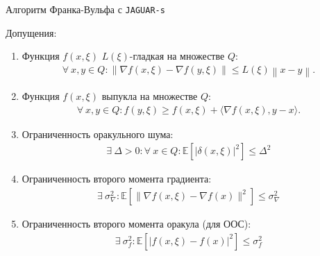 \documentclass{beamer}
\begin{document}
\begin{frame}{Алгоритм Франка-Вульфа с \texttt{JAGUAR-s}}

    Допущения:
    \small{
        \begin{enumerate}
            \item Функция $f(x, \xi)$ $L(\xi)$-гладкая на множестве $Q$: 
                \begin{align*}
                    \forall\ x, y \in Q: \left\| \nabla f(x, \xi) - \nabla f(y, \xi) \right\| \leq L(\xi) \left\|x-y\right\|.
                \end{align*}
            \item Функция $f(x, \xi)$ выпукла на множестве $Q$:
                \begin{align*}
                    \forall\ x, y \in Q: f(y, \xi) \geq f(x, \xi) + \langle \nabla f(x, \xi), y - x \rangle.
                \end{align*}
            \item Ограниченность оракульного шума:
                \begin{align*}
                    \exists\ \Delta > 0: \forall\ x \in Q: \mathbb{E} \left[ |\delta(x, \xi)|^2 \right] \leq \Delta^2
                \end{align*}
            \item Ограниченность второго момента градиента:
                \begin{align*}
                    \exists\ \sigma^2_{\nabla}: \mathbb{E} \left[ \| \nabla f(x, \xi) - \nabla f(x) \|^2 \right] \leq \sigma^2_{\nabla}
                \end{align*}
            \item Ограниченность второго момента оракула (для ООС):
                \begin{align*}
                    \exists\ \sigma^2_{f}: \mathbb{E} \left[ \left|f(x, \xi) - f(x) \right|^2 \right] \leq \sigma^2_{f}
                \end{align*}
        \end{enumerate}
    }

\end{frame}

\end{document}
